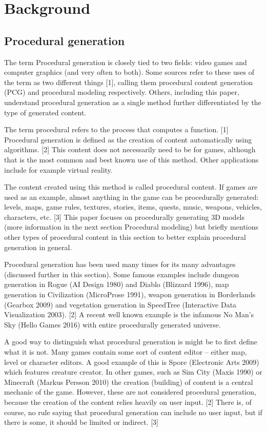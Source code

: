 \documentclass[
  digital, %
  table,   %
  nolof,     %
  nolot,     %
]{fithesis3}
\begin{document}
\chapter{Background}
\section{Procedural generation}
The term Procedural generation is closely tied to two fields: video games and computer graphics (and very often to both). Some sources refer to these uses of the term as two different things [1], calling them procedural content generation (PCG) and procedural modeling respectively. Others, including this paper, understand procedural generation as a single method further differentiated by the type of generated content. \par
The term procedural refers to the process that computes a function. [1] Procedural generation is defined as the creation of content automatically using algorithms. [2] This content does not necessarily need to be for games, although that is the most common and best known use of this method. Other applications include for example virtual reality.\par
The content created using this method is called procedural content. If games are used as an example, almost anything in the game can be procedurally generated: levels, maps, game rules, textures, stories, items, quests, music, weapons, vehicles, characters, etc. [3] This paper focuses on procedurally generating 3D models (more information in the next section Procedural modeling) but briefly mentions other types of procedural content in this section to better explain procedural generation in general. \par
Procedural generation has been used many times for its many advantages (discussed further in this section). Some famous examples include dungeon generation in Rogue (AI Design 1980) and Diablo (Blizzard 1996), map generation in Civilization (MicroProse 1991), weapon generation in Borderlands (Gearbox 2009) and vegetation generation in SpeedTree (Interactive Data Visualization 2003). [2] A recent well known example is the infamous No Man’s Sky (Hello Games 2016) with entire procedurally generated universe.\par
A good way to distinguish what procedural generation is might be to first define what it is not. Many games contain some sort of content editor – either map, level or character editors. A good example of this is Spore (Electronic Arts 2009) which features creature creator. In other games, such as Sim City (Maxis 1990) or Minecraft (Markus Persson 2010) the creation (building) of content is a central mechanic of the game. However, these are not considered procedural generation, because the creation of the content relies heavily on user input. [2] There is, of course, no rule saying that procedural generation can include no user input, but if there is some, it should be limited or indirect. [3]\par
\end{document}
